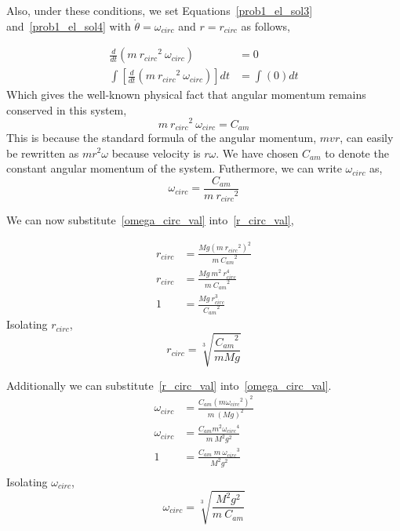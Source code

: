 \documentclass[conference]{IEEEtran}
\begin{document}
Also, under these conditions, we set Equations~\ref{prob1_el_sol3} and~\ref{prob1_el_sol4}
with $\dot{\theta} = \omega_{circ}$ and $r = r_{circ}$ as follows,

\begin{align*}
    \frac{d}{dt}\left( m~{r_{circ}}^2~\omega_{circ} \right) &= 0\\
    \int \left[ \frac{d}{dt}\left( m~{r_{circ}}^2~\omega_{circ} \right) \right] dt &= \int (0) dt
\end{align*}
Which gives the well-known physical fact that angular momentum remains conserved in this system,
\begin{equation}\label{prob1_ang_momentum_eq}
    m~{r_{circ}}^2~\omega_{circ} = C_{am}
\end{equation}
This is because the standard formula of the angular momentum, $mvr$, can
easily be rewritten as $mr^2\omega$ because velocity is $r\omega$. We have
chosen $C_{am}$ to denote the constant angular momentum of the system.
Futhermore, we can write $\omega_{circ}$ as,
\begin{equation}\label{omega_circ_val}
    \omega_{circ} = \frac{C_{am}}{m~{r_{circ}}^2}
\end{equation}

We can now substitute~\ref{omega_circ_val} into~\ref{r_circ_val},

\begin{align*}
    r_{circ} &= \frac{Mg(m~{r_{circ}}^2)^2}{m~{C_{am}}^2}\\
    r_{circ} &= \frac{Mg~m^2~r_{circ}^4}{m~{C_{am}}^2}\\
    1 &= \frac{Mg~r_{circ}^3}{{C_{am}}^2}
\end{align*}
Isolating $r_{circ}$,
\begin{equation}\label{prob1_obj4_r}
    r_{circ} = \sqrt[3]{\frac{{C_{am}}^2}{mMg}}
\end{equation}

Additionally we can substitute~\ref{r_circ_val} into~\ref{omega_circ_val}.
\begin{align*}
    \omega_{circ} &= \frac{C_{am}(m{\omega_{circ}}^2)^2}{m~{(Mg)}^2}\\
    \omega_{circ} &= \frac{C_{am}m^2{\omega_{circ}}^4}{m~M^2g^2}\\
    1 &= \frac{C_{am}~m~{\omega_{circ}}^3}{M^2g^2}\\
\end{align*}
Isolating $\omega_{circ}$,
\begin{equation}\label{prob4_obj4_omega}
    \omega_{circ} = \sqrt[3]{\frac{M^2g^2}{m~C_{am}}}
\end{equation}
\end{document}
